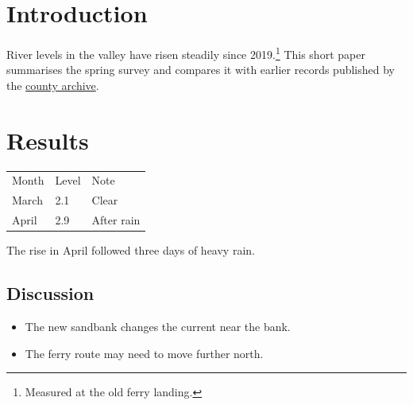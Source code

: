 \documentclass{article}
\begin{document}
\section{Introduction}
River levels in the valley have risen steadily since 2019.\footnote{Measured at the old ferry landing.}
This short paper summarises the spring survey and compares it with earlier records
published by the \href{https://example.org/archive}{county archive}.

\section{Results}
\begin{tabular}{lll}
Month & Level & Note \\
March & 2.1 & Clear \\
April & 2.9 & After rain \\
\end{tabular}

The rise in April followed three days of heavy rain.

\subsection{Discussion}
\begin{itemize}
\item The new sandbank changes the current near the bank.
\item The ferry route may need to move further north.
\end{itemize}
\end{document}
